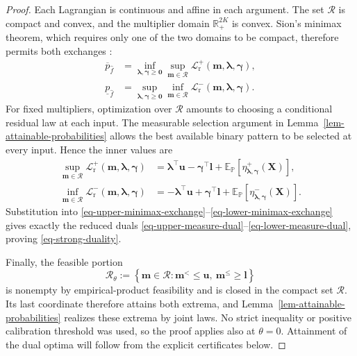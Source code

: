 \documentclass[review,11pt,3p,authoryear,nopreprintline]{elsarticle}
\begin{document}
\begin{proof}
  Each Lagrangian is continuous and affine in each argument. The set $\mathcal R$ is compact and convex, and the multiplier domain $\mathbb R_+^{2K}$ is convex. Sion's minimax theorem, which requires only one of the two domains to be compact, therefore permits both exchanges \citep{S58}:
  \begin{align}
    \overline p_{\hat f}
    &=\inf_{\bm\lambda,\bm\gamma\ge\bm0}\sup_{\bm m\in\mathcal R}
      \mathcal L_{\mathrm r}^+(\bm m,\bm\lambda,\bm\gamma),
      \label{eq-upper-minimax-exchange}\\
    \underline p_{\hat f}
    &=\sup_{\bm\lambda,\bm\gamma\ge\bm0}\inf_{\bm m\in\mathcal R}
      \mathcal L_{\mathrm r}^-(\bm m,\bm\lambda,\bm\gamma).
      \label{eq-lower-minimax-exchange}
  \end{align}
  For fixed multipliers, optimization over $\mathcal R$ amounts to choosing a conditional residual law at each input. The measurable selection argument in Lemma~\ref{lem-attainable-probabilities} allows the best available binary pattern to be selected at every input. Hence the inner values are
  \begin{align}
    \sup_{\bm m\in\mathcal R}\mathcal L_{\mathrm r}^+(\bm m,\bm\lambda,\bm\gamma)
    &=\bm\lambda^\top\bm u-\bm\gamma^\top\bm l
      +\mathbb E_{\mathbb P}\left[\eta^+_{\bm\lambda,\bm\gamma}(\bm X)\right],
      \label{eq-upper-inner-value}\\
    \inf_{\bm m\in\mathcal R}\mathcal L_{\mathrm r}^-(\bm m,\bm\lambda,\bm\gamma)
    &=-\bm\lambda^\top\bm u+\bm\gamma^\top\bm l
      +\mathbb E_{\mathbb P}\left[\eta^-_{\bm\lambda,\bm\gamma}(\bm X)\right].
      \label{eq-lower-inner-value}
  \end{align}
  Substitution into \eqref{eq-upper-minimax-exchange}--\eqref{eq-lower-minimax-exchange} gives exactly the reduced duals \eqref{eq-upper-measure-dual}--\eqref{eq-lower-measure-dual}, proving \eqref{eq-strong-duality}.

  Finally, the feasible portion
  \[
    \mathcal R_\theta:=\left\{\bm m\in\mathcal R:
      \bm m^{<}\le\bm u,\ \bm m^{\le}\ge\bm l\right\}
  \]
  is nonempty by empirical-product feasibility and is closed in the compact set $\mathcal R$. Its last coordinate therefore attains both extrema, and Lemma~\ref{lem-attainable-probabilities} realizes these extrema by joint laws. No strict inequality or positive calibration threshold was used, so the proof applies also at $\theta=0$. Attainment of the dual optima will follow from the explicit certificates below.
\end{proof}
\end{document}
